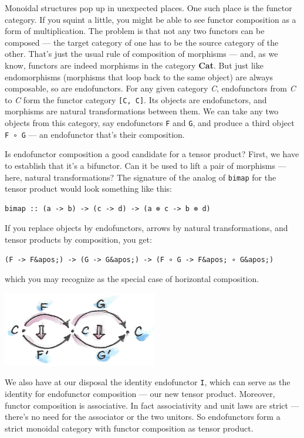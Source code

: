 Monoidal structures pop up in unexpected places. One such place is the
functor category. If you squint a little, you might be able to see
functor composition as a form of multiplication. The problem is that not
any two functors can be composed --- the target category of one has to
be the source category of the other. That's just the usual rule of
composition of morphisms --- and, as we know, functors are indeed
morphisms in the category \textbf{Cat}. But just like endomorphisms
(morphisms that loop back to the same object) are always composable, so
are endofunctors. For any given category \emph{C}, endofunctors from
\emph{C} to \emph{C} form the functor category \texttt{{[}C,\ C{]}}. Its
objects are endofunctors, and morphisms are natural transformations
between them. We can take any two objects from this category, say
endofunctors \texttt{F} and \texttt{G}, and produce a third object
\texttt{F\ ∘\ G} --- an endofunctor that's their composition.

Is endofunctor composition a good candidate for a tensor product? First,
we have to establish that it's a bifunctor. Can it be used to lift a
pair of morphisms --- here, natural transformations? The signature of
the analog of \texttt{bimap} for the tensor product would look something
like this:

\begin{verbatim}
bimap :: (a -> b) -> (c -> d) -> (a ⊗ c -> b ⊗ d)
\end{verbatim}

If you replace objects by endofunctors, arrows by natural
transformations, and tensor products by composition, you get:

\begin{verbatim}
(F -> F&apos;) -> (G -> G&apos;) -> (F ∘ G -> F&apos; ∘ G&apos;)
\end{verbatim}

which you may recognize as the special case of horizontal composition.

\includegraphics[width=2.65625in]{images/horizcomp.png}

We also have at our disposal the identity endofunctor \texttt{I}, which
can serve as the identity for endofunctor composition --- our new tensor
product. Moreover, functor composition is associative. In fact
associativity and unit laws are strict --- there's no need for the
associator or the two unitors. So endofunctors form a strict monoidal
category with functor composition as tensor product.

